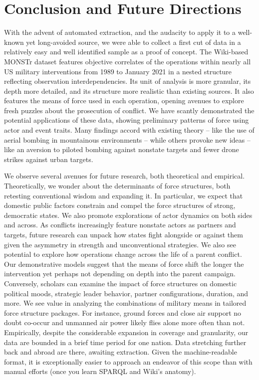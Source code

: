 \documentclass[fleqn,12pt]{article}
\begin{document}
\section*{Conclusion and Future Directions}
With the advent of automated extraction, and the audacity to apply it to a well-known yet long-avoided source, we were able to collect a first cut of data in a relatively easy and well identified sample as a proof of concept. The Wiki-based MONSTr dataset features objective correlates of the operations within nearly all US military interventions from 1989 to January 2021 in a nested structure reflecting observation interdependencies. Its unit of analysis is more granular, its depth more detailed, and its structure more realistic than existing sources. It also features the means of force used in each operation, opening avenues to explore fresh puzzles about the prosecution of conflict. We have scantly demonstrated the potential applications of these data, showing preliminary patterns of force using actor and event traits. Many findings accord with existing theory -- like the use of aerial bombing in mountainous environments -- while others provoke new ideas -- like an aversion to piloted bombing against nonstate targets and fewer drone strikes against urban targets.

We observe several avenues for future research, both theoretical and empirical. Theoretically, we wonder about the determinants of force structures, both retesting conventional wisdom and expanding it. In particular, we expect that domestic public factors constrain and compel the force structures of strong, democratic states. We also promote explorations of actor dynamics on both sides and across. As conflicts increasingly feature nonstate actors as partners and targets, future research can unpack how states fight alongside or against them given the asymmetry in strength and unconventional strategies. We also see potential to explore how operations change across the life of a parent conflict. Our demonstrative models suggest that the means of force shift the longer the intervention yet perhaps not depending on depth into the parent campaign. Conversely, scholars can examine the impact of force structures on domestic political moods, strategic leader behavior, partner configurations, duration, and more. We see value in analyzing the combinations of military means in tailored force structure packages. For instance, ground forces and close air support no doubt co-occur and unmanned air power likely flies alone more often than not. Empirically, despite the considerable expansion in coverage and granularity, our data are bounded in a brief time period for one nation. Data stretching further back and abroad are there, awaiting extraction. Given the machine-readable format, it is exceptionally easier to approach an endeavor of this scope than with manual efforts (once you learn SPARQL and Wiki's anatomy). 
\end{document}
